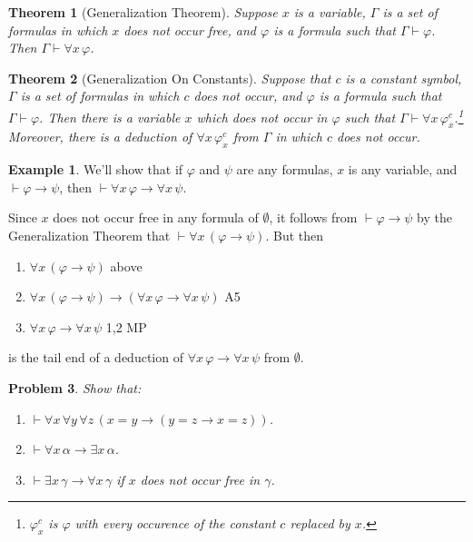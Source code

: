 \documentclass[12pt]{amsbook}
\newcommand{\proves}{\vdash}
\theoremstyle{plain}
\newtheorem{thm}{Theorem}[chapter]
\newtheorem{prob}[thm]{Problem}
\theoremstyle{definition}
\newtheorem{exmp}{Example}[chapter]
\theoremstyle{remark}
\begin{document}
\begin{thm}[Generalization Theorem] \label{t:gen} 
Suppose $x$ is a variable,  $\Gamma$ is a set of formulas in which $x$ does not occur free,  and $\varphi$ is a formula such that $\Gamma \proves \varphi$.  Then $\Gamma \proves \forall x \, \varphi$.
\end{thm}

\begin{thm}[Generalization On Constants] \label{t:genc} 
Suppose that $c$ is a constant symbol,  $\Gamma$ is a set of formulas in which $c$ does not occur,  and $\varphi$ is a formula such that $\Gamma \proves \varphi$.  Then there is a variable $x$ which does not occur in $\varphi$ such that $\Gamma \proves \forall x \, \varphi^c_x$.\footnote{$\varphi^c_x$ is $\varphi$ with every occurence of the constant $c$ replaced by $x$.}  Moreover,  there is a deduction of $\forall x \, \varphi^c_x$ from $\Gamma$ in which $c$ does not occur.
\end{thm}

\begin{exmp}
We'll show that if $\varphi$ and $\psi$ are any formulas,  $x$ is any variable,  and $\proves \varphi \to \psi$,  then $\proves \forall x\, \varphi \to \forall x\, \psi$.

Since $x$ does not occur free in any formula of $\emptyset$,  it follows from $\proves \varphi \to \psi$ by the Generalization Theorem that $\proves \forall x\, (\varphi \to \psi)$.  But then
\begin{enumerate}
\item $\forall x\, (\varphi \to \psi)$ \hfill above
\item $\forall x\, (\varphi \to \psi) \to (\forall x\, \varphi \to \forall x\, \psi)$ \hfill A5
\item $\forall x\, \varphi \to \forall x\, \psi$ \hfill 1,2 MP
\end{enumerate}
is the tail end of a deduction of $\forall x\, \varphi \to \forall x\, \psi$ from $\emptyset$.
\end{exmp}

\begin{prob} \label{p:seven12}
Show that:
\begin{enumerate}
\item $\proves \forall x\, \forall y\, \forall z\, ( x = y \to (y = z \to x = z) )$.
\item $\proves \forall x\, \alpha \to \exists x\, \alpha$.
\item $\proves \exists x \, \gamma \to \forall x\, \gamma$ if $x$ does not occur free in $\gamma$.
\end{enumerate}
\end{prob}
\end{document}
